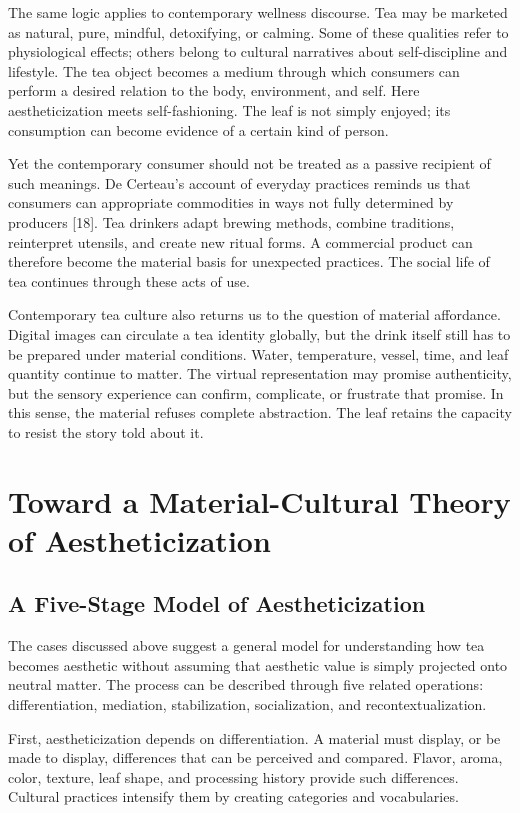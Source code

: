 \documentclass[11pt,a4paper]{article}
\begin{document}
The same logic applies to contemporary wellness discourse. Tea may be marketed as natural, pure, mindful, detoxifying, or calming. Some of these qualities refer to physiological effects; others belong to cultural narratives about self-discipline and lifestyle. The tea object becomes a medium through which consumers can perform a desired relation to the body, environment, and self. Here aestheticization meets self-fashioning. The leaf is not simply enjoyed; its consumption can become evidence of a certain kind of person.

Yet the contemporary consumer should not be treated as a passive recipient of such meanings. De Certeau's account of everyday practices reminds us that consumers can appropriate commodities in ways not fully determined by producers [18]. Tea drinkers adapt brewing methods, combine traditions, reinterpret utensils, and create new ritual forms. A commercial product can therefore become the material basis for unexpected practices. The social life of tea continues through these acts of use.

Contemporary tea culture also returns us to the question of material affordance. Digital images can circulate a tea identity globally, but the drink itself still has to be prepared under material conditions. Water, temperature, vessel, time, and leaf quantity continue to matter. The virtual representation may promise authenticity, but the sensory experience can confirm, complicate, or frustrate that promise. In this sense, the material refuses complete abstraction. The leaf retains the capacity to resist the story told about it.

\section{Toward a Material-Cultural Theory of Aestheticization}

\subsection{A Five-Stage Model of Aestheticization}

The cases discussed above suggest a general model for understanding how tea becomes aesthetic without assuming that aesthetic value is simply projected onto neutral matter. The process can be described through five related operations: differentiation, mediation, stabilization, socialization, and recontextualization.

First, aestheticization depends on differentiation. A material must display, or be made to display, differences that can be perceived and compared. Flavor, aroma, color, texture, leaf shape, and processing history provide such differences. Cultural practices intensify them by creating categories and vocabularies.
\end{document}
